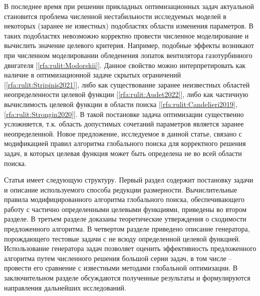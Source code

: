 \documentclass[10pt,a4paper]{book}
\begin{document}
В последнее время при решении прикладных оптимизационных задач актуальной становится проблема численной нестабильности исследуемых моделей в некоторых (заранее не известных) подобластях области изменения параметров.
В таких подобластях невозможно корректно провести численное моделирование и вычислить значение целевого критерия.
Например, подобные эффекты возникают при численном моделировании обледенения лопаток вентилятора газотурбинного двигателя [\ref{rfa:rulit:Modorskii}].
Данное свойство можно интерпретировать как наличие в оптимизационной задаче скрытых ограничений [\ref{rfa:rulit:Stripinis2021}], либо как существование  заранее неизвестных областей неопределенности целевой функции [\ref{rfa:rulit:Audet2022}], либо как частичную вычислимость целевой функции в области поиска [\ref{rfa:rulit:Candelieri2019},\ref{rfa:rulit:Strongin2020}]. В такой постановке задача оптимизации существенно усложняется, т.к. область допустимых сочетаний параметров является заранее неопределенной. Новое предложение, исследуемое в данной статье, связано с модификацией правил алгоритма глобального поиска для корректного решения задач, в которых целевая функция может быть определена не во всей области поиска.

Статья имеет следующую структуру. Первый раздел содержит постановку задачи и описание используемого способа редукции размерности. Вычислительные правила модифицированного алгоритма глобального поиска, обеспечивающего работу с частично определенными целевыми функциями, приведены во втором разделе. В третьем разделе доказаны теоретические утверждения о сходимости предложенного алгоритма. В четвертом разделе приведено описание генератора, порождающего тестовые задачи с не всюду определенной целевой функцией. Использование генератора задач позволяет оценить эффективность предложенного алгоритма путем численного решения большой серии задач, в том числе -- провести его сравнение с известными методами глобальной оптимизации. В заключительном разделе обсуждаются полученные результаты и формулируются направления дальнейших исследований.
\end{document}
